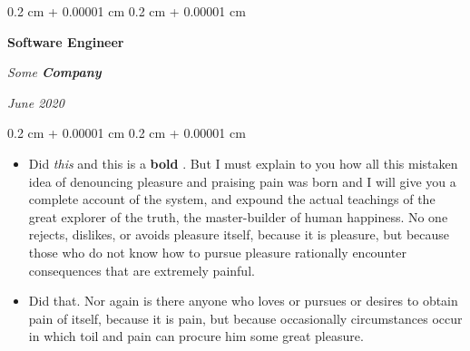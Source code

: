 \documentclass[10pt, letterpaper]{article}
\newenvironment{highlights}{
    \begin{itemize}[
        topsep=0.10 cm,
        parsep=0.10 cm,
        partopsep=0pt,
        itemsep=0pt,
        leftmargin=0.4 cm + 10pt
    ]
}{
    \end{itemize}
} %
\newenvironment{onecolentry}{
    \begin{adjustwidth}{
        0.2 cm + 0.00001 cm
    }{
        0.2 cm + 0.00001 cm
    }
}{
    \end{adjustwidth}
} %
\newenvironment{twocolentry}[2][]{
    \onecolentry
    \def\secondColumn{#2}
    \setcolumnwidth{\fill, 4.5 cm}
    \begin{paracol}{2}
}{
    \switchcolumn \raggedleft \secondColumn
    \end{paracol}
    \endonecolentry
} %
\let\hrefWithoutArrow\href
\renewcommand{\href}[2]{\hrefWithoutArrow{#1}{\ifthenelse{\equal{#2}{}}{ }{#2 }\raisebox{.15ex}{\footnotesize \faExternalLink*}}}
\begin{document}
        \begin{twocolentry}{
            
            
        \textit{June 2020}}
            \textbf{Software Engineer}
            
            \textit{Some \textbf{Company}}
        \end{twocolentry}
        \vspace{0.10 cm}
        \begin{onecolentry}
            \begin{highlights}
                \item Did \textit{this} and this is a \textbf{bold} \href{https://example.com}{link}. But I must explain to you how all this mistaken idea of denouncing pleasure and praising pain was born and I will give you a complete account of the system, and expound the actual teachings of the great explorer of the truth, the master-builder of human happiness. No one rejects, dislikes, or avoids pleasure itself, because it is pleasure, but because those who do not know how to pursue pleasure rationally encounter consequences that are extremely painful.
                \item Did that. Nor again is there anyone who loves or pursues or desires to obtain pain of itself, because it is pain, but because occasionally circumstances occur in which toil and pain can procure him some great pleasure.
            \end{highlights}
        \end{onecolentry}


        \vspace{0.2 cm}
\end{document}
